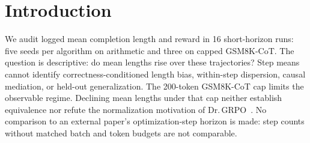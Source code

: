 \section{Introduction}
\label{sec:p4-intro}
We audit logged mean completion length and reward in 16 short-horizon runs:
five seeds per algorithm on arithmetic and three on capped GSM8K-CoT.
The question is descriptive: do mean lengths rise over these trajectories?
Step means cannot identify correctness-conditioned length bias, within-step
dispersion, causal mediation, or held-out generalization. The 200-token
GSM8K-CoT cap limits the observable regime. Declining mean lengths under
that cap neither establish equivalence nor refute the normalization
motivation of Dr.\,GRPO~\citep{tong2025drgrpo}.
No comparison to an external paper's optimization-step horizon is made:
step counts without matched batch and token budgets are not comparable.
\endinput %
GRPO~\citep{shao2024deepseekmath, guo2025deepseekr1} normalizes the group-relative
advantage by response length. This introduces a potential length bias: when reward
is sparse and binary, longer completions have more chances to stumble into a
correct answer, and a length-dividing update can reward verbosity as a proxy for
competence. Dr.\,GRPO~\citep{tong2025drgrpo} removes the per-response
$1/L$ factor, restoring the sequence-level gradient up to a global scale, and is
motivated precisely as a fix for reward hacking through length. Whether this fix
produces better held-out generalization in practice is the question of this pillar.

The concern matters because length inflation is a well-documented failure mode of
reward optimization~\citep{ouyang2022training, christiano2017deeprlhf}, and because
held-out gains can be manufactured by a policy that pads its outputs rather than
reasoning better. A careful comparison must therefore control both length and
memorization, and must distinguish a genuine direct effect on accuracy from an
indirect effect mediated by verbosity.

